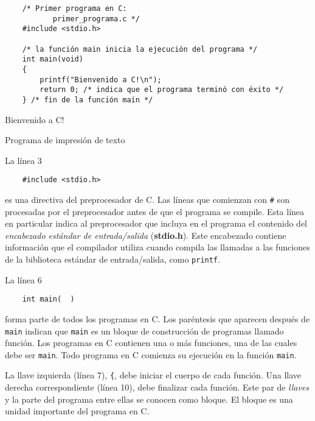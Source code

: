 \begin{listing}[h!]
\begin{verbatim}
    /* Primer programa en C:
           primer_programa.c */
    #include <stdio.h>
    
    /* la función main inicia la ejecución del programa */
    int main(void)
    {
        printf("Bienvenido a C!\n");
        return 0; /* indica que el programa terminó con éxito */
    } /* fin de la función main */
\end{verbatim}
\begin{compilado}
    Bienvenido a C!
\end{compilado}
\caption{Programa de impresión de texto}\label{Programa1}
\end{listing}
\noindent La línea 3
\begin{verbatim}
    #include <stdio.h>
\end{verbatim}
\noindent es una directiva del preprocesador de C. Las líneas que comienzan con \texttt{#} son procesadas por el preprocesador antes de que el programa se compile. Esta línea en particular indica al preprocesador que incluya en el programa el contenido del \emph{encabezado estándar de entrada/salida} (\textbf{stdio.h}). Este encabezado contiene información que el compilador utiliza cuando compila las llamadas a las funciones de la biblioteca estándar de entrada/salida, como \texttt{printf}.

La línea 6
\begin{verbatim}
    int main(  )
\end{verbatim}
\noindent forma parte de todos los programas en C. Los paréntesis que aparecen después de \texttt{main} indican que \texttt{main} es un bloque de construcción de programas llamado función. Los programas en C contienen una o más funciones, una de las cuales debe ser \texttt{main}. Todo programa en C comienza su ejecución en la función \texttt{main}.

La llave izquierda (línea 7), \verb|{|, debe iniciar el cuerpo de cada función. Una llave derecha correspondiente (línea 10), debe finalizar cada función. Este par de \emph{llaves} y la parte del programa entre ellas se conocen como bloque. El bloque es una unidad importante del programa en C.

